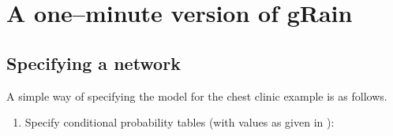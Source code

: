 \documentclass[10pt]{article}\usepackage[]{graphicx}\usepackage[]{color}
\def\grbn{{\bf gRain}}
\begin{document}
\section{A one--minute version of  \grbn{}}
\label{sec:oneminute}

\subsection{Specifying a network}
\label{sec:specifying-network}

A simple way of  specifying the model for the chest clinic
example is as follows.

\begin{enumerate}
\item Specify conditional probability tables (with values as given in
  \cite{lau/spieg:88}):


\end{enumerate}
\end{document}
